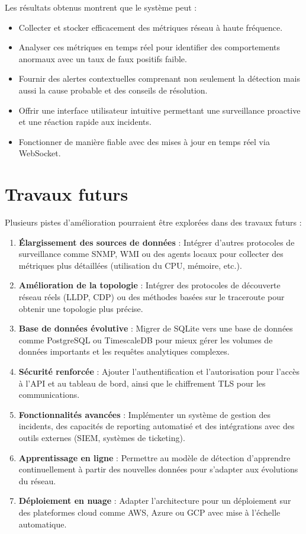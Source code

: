 \documentclass[12pt,a4paper]{report}
\begin{document}
Les résultats obtenus montrent que le système peut :
\begin{itemize}
    \item Collecter et stocker efficacement des métriques réseau à haute fréquence.
    \item Analyser ces métriques en temps réel pour identifier des comportements anormaux avec un taux de faux positifs faible.
    \item Fournir des alertes contextuelles comprenant non seulement la détection mais aussi la cause probable et des conseils de résolution.
    \item Offrir une interface utilisateur intuitive permettant une surveillance proactive et une réaction rapide aux incidents.
    \item Fonctionner de manière fiable avec des mises à jour en temps réel via WebSocket.
\end{itemize}

\section{Travaux futurs}
Plusieurs pistes d'amélioration pourraient être explorées dans des travaux futurs :
\begin{enumerate}
    \item \textbf{Élargissement des sources de données} : Intégrer d'autres protocoles de surveillance comme SNMP, WMI ou des agents locaux pour collecter des métriques plus détaillées (utilisation du CPU, mémoire, etc.).
    \item \textbf{Amélioration de la topologie} : Intégrer des protocoles de découverte réseau réels (LLDP, CDP) ou des méthodes basées sur le traceroute pour obtenir une topologie plus précise.
    \item \textbf{Base de données évolutive} : Migrer de SQLite vers une base de données comme PostgreSQL ou TimescaleDB pour mieux gérer les volumes de données importants et les requêtes analytiques complexes.
    \item \textbf{Sécurité renforcée} : Ajouter l'authentification et l'autorisation pour l'accès à l'API et au tableau de bord, ainsi que le chiffrement TLS pour les communications.
    \item \textbf{Fonctionnalités avancées} : Implémenter un système de gestion des incidents, des capacités de reporting automatisé et des intégrations avec des outils externes (SIEM, systèmes de ticketing).
    \item \textbf{Apprentissage en ligne} : Permettre au modèle de détection d'apprendre continuellement à partir des nouvelles données pour s'adapter aux évolutions du réseau.
    \item \textbf{Déploiement en nuage} : Adapter l'architecture pour un déploiement sur des plateformes cloud comme AWS, Azure ou GCP avec mise à l'échelle automatique.
\end{enumerate}
\end{document}
